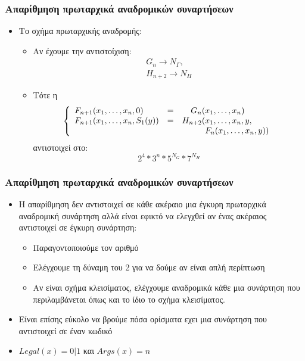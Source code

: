 \documentclass{beamer}
\begin{document}
\begin{frame}
        \frametitle{Απαρίθμηση πρωταρχικά αναδρομικών συναρτήσεων}
        \begin{itemize}
                \item Το σχήμα πρωταρχικής αναδρομής:
                \begin{itemize}
                        \item Αν έχουμε την αντιστοίχιση:
                        $$\begin{array}{l}
                            G_n \rightarrow N_Γ,\\
                            H_{n+2} \rightarrow N_H
                        \end{array}$$
                \pause
                        \item Τότε η 
                        $$\left\{
                            \begin{array}{llr@{}l}
                              F_{n+1}(x_1,\ldots,x_n, 0)     &=&    G_n(&x_1,\ldots,x_n) \\
                              F_{n+1}(x_1,\ldots,x_n, S_1(y))&=&H_{n+2}(&x_1,\ldots,x_n, y ,\\
                                                             & &        &F_n(x_1,\ldots,x_n, y))
                            \end{array}
                        \right.$$
                        αντιστοιχεί στο:
                        $$ 2^4*3^n*5^{N_G}*7^{N_H} $$
                \end{itemize}                   
        \end{itemize}
\end{frame}

\begin{frame}
        \frametitle{Απαρίθμηση πρωταρχικά αναδρομικών συναρτήσεων}
        \begin{itemize}
                \item Η απαρίθμηση δεν αντιστοιχεί σε κάθε ακέραιο μια έγκυρη
                πρωταρχικά αναδρομική συνάρτηση αλλά είναι εφικτό να ελεγχθεί αν
                ένας ακέραιος αντιστοιχεί σε έγκυρη συνάρτηση:
                \pause
                \begin{itemize}
                        \item Παραγοντοποιούμε τον αριθμό
                \pause
                        \item Ελέγχουμε τη δύναμη του 2 για να δούμε αν είναι απλή περίπτωση
                \pause
                        \item Αν είναι σχήμα κλεισίματος, ελέγχουμε αναδρομικά κάθε μια συνάρτηση
                        που περιλαμβάνεται όπως και το ίδιο το σχήμα κλεισίματος.
                \end{itemize}
                \pause
                \item Είναι επίσης εύκολο να βρούμε πόσα ορίσματα εχει μια συνάρτηση που αντιστοιχεί σε έναν κωδικό
                \pause
                \item $Legal(x)=0|1$ και $Args(x)=n$
        \end{itemize}
\end{frame}
\end{document}
